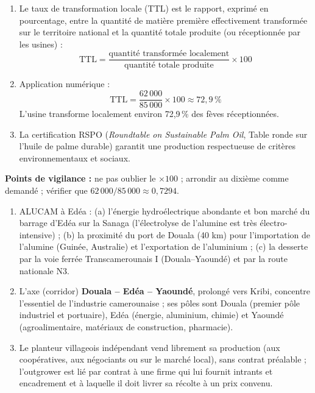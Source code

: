 \documentclass[11pt]{article}
\newcommand{\cle}[1]{{\popxbold\color{popdark}#1}}
\begin{document}
\begin{corrige}
\begin{enumerate}
    \item Le \cle{taux de transformation locale} (TTL) est le rapport, exprimé en pourcentage, entre la quantité de matière première effectivement transformée sur le territoire national et la quantité totale produite (ou réceptionnée par les usines) :
    \[ \text{TTL} = \frac{\text{quantité transformée localement}}{\text{quantité totale produite}} \times 100 \]
    \item Application numérique :
    \[ \text{TTL} = \frac{62\,000}{85\,000} \times 100 \approx 72{,}9\,\% \]
    L'usine transforme localement environ 72,9\,\% des fèves réceptionnées.
    \item La certification \cle{RSPO} (\emph{Roundtable on Sustainable Palm Oil}, Table ronde sur l'huile de palme durable) garantit une production respectueuse de critères environnementaux et sociaux.
\end{enumerate}
\textbf{Points de vigilance :} ne pas oublier le $\times 100$ ; arrondir au dixième comme demandé ; vérifier que $62\,000/85\,000 \approx 0{,}7294$.
\end{corrige}

\begin{corrige}
\begin{enumerate}
    \item ALUCAM à Edéa : (a) l'énergie hydroélectrique abondante et bon marché du barrage d'Edéa sur la Sanaga (l'électrolyse de l'alumine est très électro-intensive) ; (b) la proximité du port de Douala (40 km) pour l'importation de l'alumine (Guinée, Australie) et l'exportation de l'aluminium ; (c) la desserte par la voie ferrée Transcamerounais I (Douala--Yaoundé) et par la route nationale N3.
    \item L'axe (corridor) \textbf{Douala -- Edéa -- Yaoundé}, prolongé vers Kribi, concentre l'essentiel de l'industrie camerounaise ; ses pôles sont Douala (premier pôle industriel et portuaire), Edéa (énergie, aluminium, chimie) et Yaoundé (agroalimentaire, matériaux de construction, pharmacie).
    \item Le planteur villageois indépendant vend librement sa production (aux coopératives, aux négociants ou sur le marché local), sans contrat préalable ; l'outgrower est lié par contrat à une firme qui lui fournit intrants et encadrement et à laquelle il doit livrer sa récolte à un prix convenu.
\end{enumerate}
\end{corrige}
\end{document}
